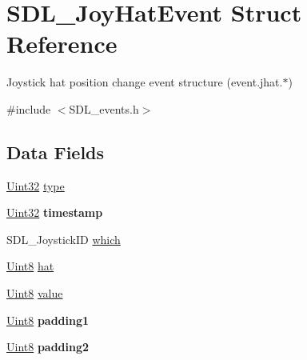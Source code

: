 \hypertarget{struct_s_d_l___joy_hat_event}{}\section{S\+D\+L\+\_\+\+Joy\+Hat\+Event Struct Reference}
\label{struct_s_d_l___joy_hat_event}


Joystick hat position change event structure (event.\+jhat.$\ast$)  




{\ttfamily \#include $<$S\+D\+L\+\_\+events.\+h$>$}

\subsection*{Data Fields}
\begin{DoxyCompactItemize}
\item 
\hyperlink{_s_d_l__stdinc_8h_add440eff171ea5f55cb00c4a9ab8672d}{Uint32} \hyperlink{struct_s_d_l___joy_hat_event_aa40a9b05c3154032b9f2d7220e9f08dc}{type}
\item 
\hyperlink{_s_d_l__stdinc_8h_add440eff171ea5f55cb00c4a9ab8672d}{Uint32} {\bfseries timestamp}\hypertarget{struct_s_d_l___joy_hat_event_abf1ed7edeab81db9c05d899836a44a2f}{}\label{struct_s_d_l___joy_hat_event_abf1ed7edeab81db9c05d899836a44a2f}

\item 
S\+D\+L\+\_\+\+Joystick\+ID \hyperlink{struct_s_d_l___joy_hat_event_a911f8b28e26cf5ad3e985e76d4987014}{which}
\item 
\hyperlink{_s_d_l__stdinc_8h_a2944638813a090aa23e62f4da842c3e2}{Uint8} \hyperlink{struct_s_d_l___joy_hat_event_a6ba9d2ca9d3fcb96dd9d63af1f70b785}{hat}
\item 
\hyperlink{_s_d_l__stdinc_8h_a2944638813a090aa23e62f4da842c3e2}{Uint8} \hyperlink{struct_s_d_l___joy_hat_event_aa4f4dc93a5c52b0806c5844196244e51}{value}
\item 
\hyperlink{_s_d_l__stdinc_8h_a2944638813a090aa23e62f4da842c3e2}{Uint8} {\bfseries padding1}\hypertarget{struct_s_d_l___joy_hat_event_a418ddf227b900bac743797ea1d27040f}{}\label{struct_s_d_l___joy_hat_event_a418ddf227b900bac743797ea1d27040f}

\item 
\hyperlink{_s_d_l__stdinc_8h_a2944638813a090aa23e62f4da842c3e2}{Uint8} {\bfseries padding2}\hypertarget{struct_s_d_l___joy_hat_event_a09e3169fff93f108fc1dab93014eb1fb}{}\label{struct_s_d_l___joy_hat_event_a09e3169fff93f108fc1dab93014eb1fb}

\end{DoxyCompactItemize}


